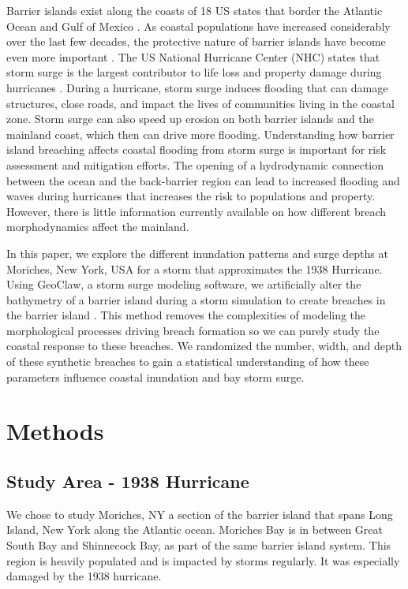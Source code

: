 \documentclass{coastal_paper}
\begin{document}
Barrier islands exist along the coasts of 18 US states that border the Atlantic Ocean and Gulf of Mexico \citep{Zhang2011}. As coastal populations have increased considerably over the last few decades, the protective nature of barrier islands have become even more important \citep{Zhang2011}. The US National Hurricane Center (NHC) states that storm surge  is the largest contributor to life loss and property damage during hurricanes \citep{Center2006}. During a hurricane, storm surge induces flooding that can damage structures, close roads, and impact the lives of communities living in the coastal zone. Storm surge can also speed up erosion on both barrier islands and the mainland coast, which then can drive more flooding. Understanding how barrier island breaching affects coastal flooding from storm surge is important for risk assessment and mitigation efforts. The opening of a hydrodynamic connection between the ocean and the back-barrier region can lead to increased flooding and waves during hurricanes that increases the risk to populations and property. However, there is little information currently available on how different breach morphodynamics affect the mainland.

In this paper, we explore the different inundation patterns and surge depths at Moriches, New York, USA for a storm that approximates the 1938 Hurricane. Using GeoClaw, a storm surge modeling software, we artificially alter the bathymetry of a barrier island during a storm simulation to create breaches in the barrier island \citep{mandli2016clawpack}. This method removes the complexities of modeling the morphological processes driving breach formation so we can purely study the coastal response to these breaches. We randomized the number, width, and depth of these synthetic breaches to gain a statistical understanding of how these parameters influence coastal inundation and bay storm surge. 

\section{Methods}
\subsection{Study Area - 1938 Hurricane}
We chose to study Moriches, NY a section of the barrier island that spans Long Island, New York along the Atlantic ocean. Moriches Bay is in between Great South Bay and Shinnecock Bay, as part of the same barrier island system. This region is heavily populated and is impacted by storms regularly. It was especially damaged by the 1938 hurricane. 
\end{document}
